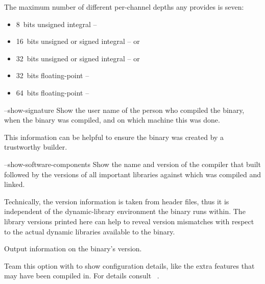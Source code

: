 \begin{codelist}
  The maximum number of different per-channel depths any \appcmd{} provides is seven:
  \begin{itemize}
  \item 8~bits unsigned integral -- 
  \item 16~bits unsigned or signed integral --  or 
  \item 32~bits unsigned or signed integral --  or 
  \item 32~bits floating-point -- 
  \item 64~bits floating-point -- 
  \end{itemize}


  \label{opt:show-signature}%
\item[--show-signature]\itemend
  Show the user name of the person who compiled the binary, when the binary was compiled, and on
  which machine this was done.

  This information can be helpful to ensure the binary was created by a trustworthy builder.


  \label{opt:show-software-components}%
\item[--show-software-components]\itemend
  Show the name and version of the compiler that built \App{} followed by the versions of all
  important libraries against which \App{} was compiled and linked.

  Technically, the version information is taken from
  header files, thus it is independent of the dynamic-library environment
  the binary runs within.  The library versions printed here can help to reveal version
  mismatches with respect to the actual dynamic libraries available to the binary.


  \label{opt:version}%
\item[\itempar{-V \\ --version}]\itemend
  Output information on the binary's version.

  Team this option with  to show configuration details, like the extra
  features that may have been compiled in.  For details consult
  \sectionName~.
\end{codelist}




